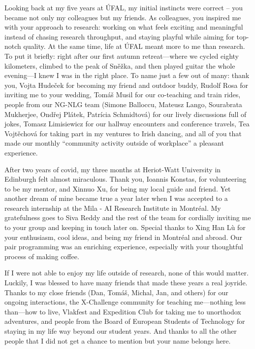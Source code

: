 \documentclass[12pt,notitlepage,a4paper,openright]{report}
\begin{document}
{    Looking back at my five years at ÚFAL, my initial instincts were correct -- you became not only my colleagues but my friends.
    As colleagues, you inspired me with your approach to research: working on what feels exciting and meaningful instead of chasing research throughput, and staying playful while aiming for top-notch quality. At the same time, life at ÚFAL meant more to me than research. To put it briefly: right after our first autumn retreat---where we cycled eighty kilometers, climbed to the peak of Sněžka, and then played guitar the whole evening---I knew I was in the right place. To name just a few out of many: thank you, Vojta Hudeček for becoming my friend and outdoor buddy, Rudolf Rosa for inviting me to your wedding, Tomáš Musil for our co-teaching and train rides, people from our NG-NLG team (Simone Balloccu, Mateusz Lango, Sourabrata Mukherjee, Ondřej Plátek, Patrícia Schmidtová) for our lively discussions full of jokes, Tomasz Limisiewicz for our hallway encounters and conference travels, Tea Vojtěchová for taking part in my ventures to Irish dancing, and all of you that made our monthly ``community activity outside of workplace'' a pleasant experience.

    After two years of covid, my three months at Heriot-Watt University in Edinburgh felt almost miraculous. Thank you, Ioannis Konstas, for volunteering to be my mentor, and Xinnuo Xu, for being my local guide and friend. Yet another dream of mine became true a year later when I was accepted to a research internship at the Mila - AI Research Institute in Montréal. My gratefulness goes to Siva Reddy and the rest of the team for cordially inviting me to your group and keeping in touch later on. Special thanks to Xing Han Lù for your enthusiasm, cool ideas, and being my friend in Montréal and abroad. Our pair programming was an enriching experience, especially with your thoughtful process of making coffee.

    If I were not able to enjoy my life outside of research, none of this would matter. Luckily, I was blessed to have many friends that made these years a real joyride. Thanks to my close friends (Dan, Tomáš, Michal, Jan, and others) for our ongoing interactions, the X-Challenge community for teaching me---nothing less than---how to live, Vlakfest and Expedition Club for taking me to unorthodox adventures, and people from the Board of European Students of Technology for staying in my life way beyond our student years. And thanks to all the other people that I did not get a chance to mention but your name belongs here.

}
\end{document}
